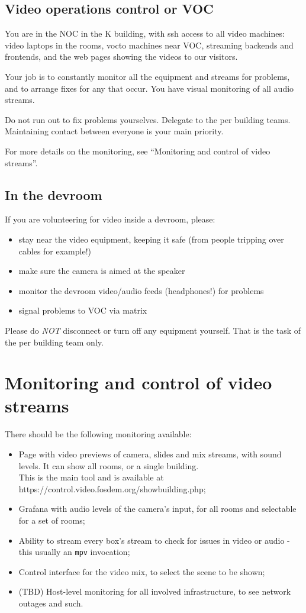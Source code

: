 \documentclass{article}
\begin{document}
\subsection{Video operations control or VOC}
You are in the NOC in the K building, with ssh access to all video machines: video laptops in the rooms, vocto machines near VOC, streaming backends and frontends, and the web pages showing the videos to our visitors.

Your job is to constantly monitor all the equipment and streams for problems, and to arrange fixes for any that occur. You have visual monitoring of all audio streams.

Do not run out to fix problems yourselves. Delegate to the per building teams. Maintaining contact between everyone is your main priority.

For more details on the monitoring, see ``Monitoring and control of video streams''.


\subsection{In the devroom}
If you are volunteering for video inside a devroom, please:
\begin{itemize}
  \item stay near the video equipment, keeping it safe (from people tripping over cables for example!)
  \item make sure the camera is aimed at the speaker
  \item monitor the devroom video/audio feeds (headphones!) for problems
  \item signal problems to VOC via matrix
\end{itemize}

Please do \emph{NOT} disconnect or turn off any equipment yourself. That is the task of the per building team only.

\section{Monitoring and control of video streams}

There should be the following monitoring available:

\begin{itemize}
  \item Page with video previews of camera, slides and mix streams, with sound levels. It can show all rooms, or a single building.\\ This is the main tool and is available at https://control.video.fosdem.org/showbuilding.php;
  \item Grafana with audio levels of the camera's input, for all rooms and selectable for a set of rooms;
  \item Ability to stream every box's stream to check for issues in video or audio - this usually an \texttt{mpv} invocation;
  \item Control interface for the video mix, to select the scene to be shown;
  \item (TBD) Host-level monitoring for all involved infrastructure, to see network outages and such.
\end{itemize}
\end{document}
